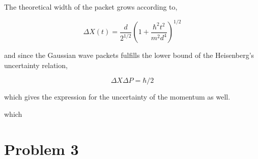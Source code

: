 The theoretical width of the packet grows according to,

\begin{equation}
\Delta X(t) =\frac{d}{2^{1/2}}\left(1+\frac{\hbar^2 t^2}{m^2 d^4}\right)^{1/2}
\end{equation}

and since the Gaussian wave packets fulfills the lower bound of the Heisenberg's uncertainty relation,

\begin{equation}
\Delta X \Delta P = \hbar/2
\end{equation}

which gives the expression for the uncertainty of the momentum as well\cite{Shankar:1994}.

which 



\section*{Problem 3}

